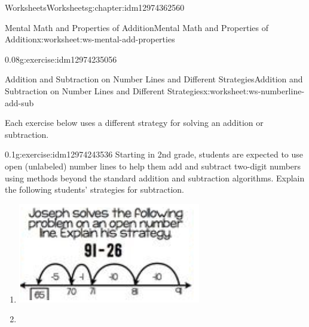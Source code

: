 \documentclass[twoside,11pt,]{book}
\begin{document}
\begin{chapterptx}{Worksheets}{}{Worksheets}{}{}{g:chapter:idm12974362560}
\begin{worksheet-section-numberless}{Mental Math and Properties of Addition}{}{Mental Math and Properties of Addition}{}{}{x:worksheet:ws-mental-add-properties}
\begin{divisionexercise}{6}{}{0.08}{g:exercise:idm12974235056}
%
\end{divisionexercise}%
\end{worksheet-section-numberless}
\restoregeometry
%
%
\typeout{************************************************}
\typeout{************************************************}
%
\begin{worksheet-section-numberless}{Addition and Subtraction on Number Lines and Different Strategies}{}{Addition and Subtraction on Number Lines and Different Strategies}{}{}{x:worksheet:ws-numberline-add-sub}
\begin{introduction}{}%
Each exercise below uses a different strategy for solving an addition or subtraction.%
\end{introduction}%
\begin{divisionexercise}{1}{}{0.1}{g:exercise:idm12974243536}%
Starting in 2nd grade, students are expected to use open (unlabeled) number lines to help them add and subtract two-digit numbers using methods beyond the standard addition and subtraction algorithms.   Explain the following students’ strategies for subtraction.%
%
\begin{enumerate}[label=(\alph*)]
\item{} \begin{image}{0}{1}{0}%
\includegraphics[width=1\linewidth]{images/numberline-add-sub-1a.png}
\end{image}%
\item{} \begin{image}{0}{1}{0}%

\end{image}
\end{enumerate}
\end{divisionexercise}
\end{worksheet-section-numberless}
\end{chapterptx}
\end{document}
